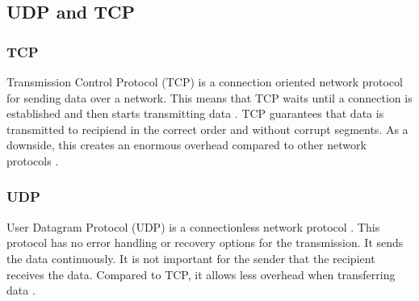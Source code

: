 \subsection{UDP and TCP}
\label{udptcp:sci}
\subsubsection{TCP}
\label{tcp:sci}
Transmission Control Protocol (TCP) is a connection oriented network protocol
for sending data over a network.
This means that TCP waits until a connection is established and
then starts transmitting data \cite{postel1981transmission}.
TCP guarantees that data is transmitted to recipiend
in the correct order and without corrupt segments.
As a downside, this creates an enormous overhead compared
to other network protocols \cite{singh2014survey}. \newline
\subsubsection{UDP}
\label{udp:sci}
User Datagram Protocol (UDP) is a connectionless network protocol \cite{postel1980user}.
This protocol has no error handling or recovery options for
the transmission. It sends the data continuously.
It is not important for the sender that the recipient receives the data.
Compared to TCP, it allows less overhead when transferring data \cite{singh2014survey}.